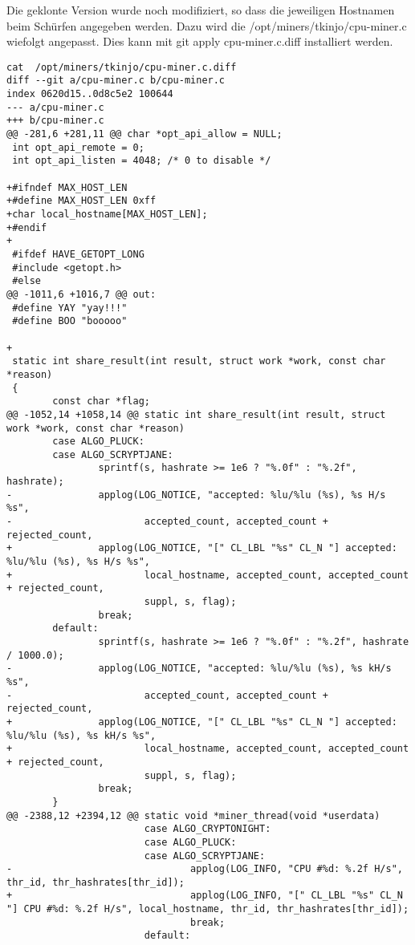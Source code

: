 Die geklonte Version wurde noch modifiziert, so dass die jeweiligen Hostnamen beim Schürfen angegeben werden. Dazu wird die /opt/miners/tkinjo/cpu-miner.c wiefolgt angepasst. Dies kann mit git apply cpu-miner.c.diff installiert werden.
\begin{lstlisting}
cat  /opt/miners/tkinjo/cpu-miner.c.diff
diff --git a/cpu-miner.c b/cpu-miner.c
index 0620d15..0d8c5e2 100644
--- a/cpu-miner.c
+++ b/cpu-miner.c
@@ -281,6 +281,11 @@ char *opt_api_allow = NULL;
 int opt_api_remote = 0;
 int opt_api_listen = 4048; /* 0 to disable */

+#ifndef MAX_HOST_LEN
+#define MAX_HOST_LEN 0xff
+char local_hostname[MAX_HOST_LEN];
+#endif
+
 #ifdef HAVE_GETOPT_LONG
 #include <getopt.h>
 #else
@@ -1011,6 +1016,7 @@ out:
 #define YAY "yay!!!"
 #define BOO "booooo"

+
 static int share_result(int result, struct work *work, const char *reason)
 {
        const char *flag;
@@ -1052,14 +1058,14 @@ static int share_result(int result, struct work *work, const char *reason)
        case ALGO_PLUCK:
        case ALGO_SCRYPTJANE:
                sprintf(s, hashrate >= 1e6 ? "%.0f" : "%.2f", hashrate);
-               applog(LOG_NOTICE, "accepted: %lu/%lu (%s), %s H/s %s",
-                       accepted_count, accepted_count + rejected_count,
+               applog(LOG_NOTICE, "[" CL_LBL "%s" CL_N "] accepted: %lu/%lu (%s), %s H/s %s",
+                       local_hostname, accepted_count, accepted_count + rejected_count,
                        suppl, s, flag);
                break;
        default:
                sprintf(s, hashrate >= 1e6 ? "%.0f" : "%.2f", hashrate / 1000.0);
-               applog(LOG_NOTICE, "accepted: %lu/%lu (%s), %s kH/s %s",
-                       accepted_count, accepted_count + rejected_count,
+               applog(LOG_NOTICE, "[" CL_LBL "%s" CL_N "] accepted: %lu/%lu (%s), %s kH/s %s",
+                       local_hostname, accepted_count, accepted_count + rejected_count,
                        suppl, s, flag);
                break;
        }
@@ -2388,12 +2394,12 @@ static void *miner_thread(void *userdata)
                        case ALGO_CRYPTONIGHT:
                        case ALGO_PLUCK:
                        case ALGO_SCRYPTJANE:
-                               applog(LOG_INFO, "CPU #%d: %.2f H/s", thr_id, thr_hashrates[thr_id]);
+                               applog(LOG_INFO, "[" CL_LBL "%s" CL_N "] CPU #%d: %.2f H/s", local_hostname, thr_id, thr_hashrates[thr_id]);
                                break;
                        default:

\end{lstlisting}
